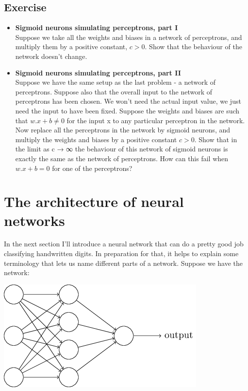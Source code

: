 \documentclass[a4paper,12pt]{report}%
\begin{document}
\subsection{Exercise}
\begin{itemize}
\item {\bf Sigmoid neurons simulating perceptrons, part I} \\
    Suppose we take all the weights and biases in a network of perceptrons, and multiply them by a positive constant, $c > 0$. Show that the behaviour of the network doesn't change.

\item {\bf Sigmoid neurons simulating perceptrons, part II}\\
    Suppose we have the same setup as the last problem - a network of perceptrons. Suppose also that the overall input to the network of perceptrons has been chosen. We won't need the actual input value, we just need the input to have been fixed. Suppose the weights and biases are such that $w.x + b \ne 0$ for the input x to any particular perceptron in the network. Now replace all the perceptrons in the network by sigmoid neurons, and multiply the weights and biases by a positive constant $c > 0$. Show that in the limit as c → ∞ the behaviour of this network of sigmoid neurons is exactly the same as the network of perceptrons. How can this fail when $w.x + b = 0$  for one of the perceptrons?
\end{itemize}


\section{The architecture of neural networks}
In the next section I'll introduce a neural network that can do a pretty good job classifying handwritten digits. In preparation for that, it helps to explain some terminology that lets us name different parts of a network. Suppose we have the network:
\begin{center}
 \includegraphics[width=0.5\linewidth]{images/tikz10.png}
\end{center}
\end{document}
